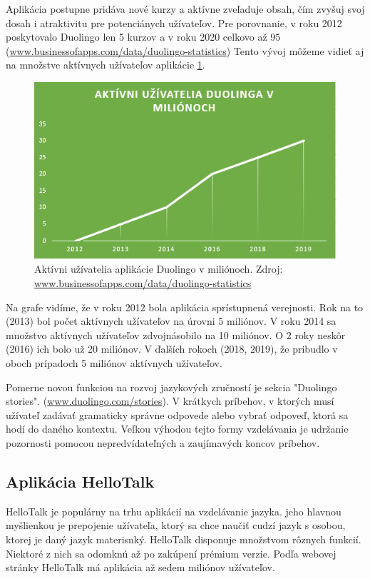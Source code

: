 \documentclass[10pt,oneside,slovak,a4paper]{article}
\begin{document}
Aplikácia postupne pridáva nové kurzy a aktívne zveľaduje obsah, čím zvyšuj svoj dosah i atraktivitu pre potenciánych užívateľov. Pre porovnanie, v roku 2012 poskytovalo Duolingo len 5 kurzov a v roku 2020 celkovo až 95 (\href{https://www.businessofapps.com/data/duolingo-statistics/}{www.businessofapps.com/data/duolingo-statistics}) Tento vývoj môžeme vidieť aj na množstve aktívnych užívateľov aplikácie \ref{duo-uzivatelia}.

\begin{figure}[h] %
\centering
\includegraphics[width=\textwidth]{duolingo.png}
\caption{ Aktívni užívatelia aplikácie Duolingo v miliónoch.
Zdroj: \href{https://www.businessofapps.com/data/duolingo-statistics/}{www.businessofapps.com/data/duolingo-statistics}}
\label{duo-uzivatelia}
\end{figure}

Na grafe vidíme, že v roku 2012 bola aplikácia sprístupnená verejnosti. Rok na to (2013) bol počet aktívnych užívateľov na úrovni 5 miliónov. V roku 2014 sa množstvo aktívnych užívateľov zdvojnásobilo na 10 miliónov. O 2 roky neskôr (2016) ich bolo už 20 miliónov. V ďalších rokoch (2018, 2019), že pribudlo v oboch prípadoch 5 miliónov aktívnych užívateľov.

Pomerne novou funkciou na rozvoj jazykových zručností je sekcia "Duolingo stories". (\href{https://www.duolingo.com/stories/}{www.duolingo.com/stories}). V krátkych príbehov, v ktorých musí užívateľ zadávať gramaticky správne odpovede alebo vybrať odpoveď, ktorá sa hodí do daného kontextu. Veľkou výhodou tejto formy vzdelávania je udržanie pozornosti pomocou nepredvídateľných a zaujímavých koncov príbehov. 

\subsection{Aplikácia HelloTalk} %
HelloTalk je populárny na trhu aplikácií na vzdelávanie jazyka. jeho hlavnou myšlienkou je prepojenie užívateľa, ktorý sa chce naučiť cudzí jazyk s osobou, ktorej je daný jazyk materisnký. HelloTalk disponuje množstvom rôznych funkcií. Niektoré z nich sa odomknú až po zakúpení prémium verzie. Podľa webovej stránky HelloTalk má aplikácia až sedem miliónov užívateľov.\cite{hellotalk}
\end{document}
